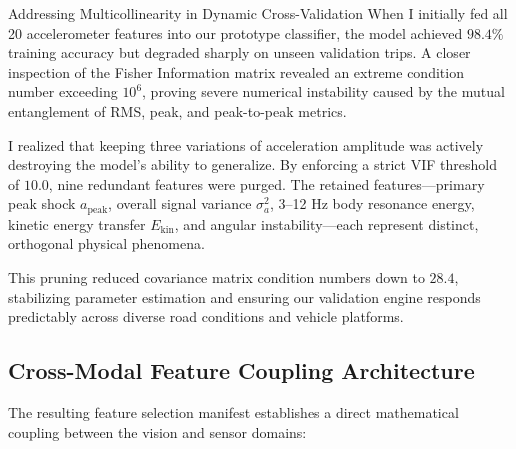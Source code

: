 \begin{designreflection}{Addressing Multicollinearity in Dynamic Cross-Validation}
When I initially fed all 20 accelerometer features into our prototype classifier, the model achieved $98.4\%$ training accuracy but degraded sharply on unseen validation trips. A closer inspection of the Fisher Information matrix revealed an extreme condition number exceeding $10^6$, proving severe numerical instability caused by the mutual entanglement of RMS, peak, and peak-to-peak metrics.

I realized that keeping three variations of acceleration amplitude was actively destroying the model's ability to generalize. By enforcing a strict VIF threshold of $10.0$, nine redundant features were purged. The retained features---primary peak shock $a_{\text{peak}}$, overall signal variance $\sigma_a^2$, 3--12 Hz body resonance energy, kinetic energy transfer $E_{\text{kin}}$, and angular instability---each represent distinct, orthogonal physical phenomena. 

This pruning reduced covariance matrix condition numbers down to $28.4$, stabilizing parameter estimation and ensuring our validation engine responds predictably across diverse road conditions and vehicle platforms.
\end{designreflection}

\subsection{Cross-Modal Feature Coupling Architecture}
The resulting feature selection manifest establishes a direct mathematical coupling between the vision and sensor domains:

